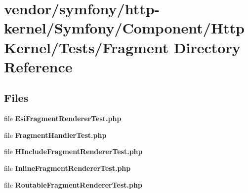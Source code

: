 \section{vendor/symfony/http-\/kernel/\+Symfony/\+Component/\+Http\+Kernel/\+Tests/\+Fragment Directory Reference}
\label{dir_25872647251e2ba33cad5cafd1098228}
\subsection*{Files}
\begin{DoxyCompactItemize}
\item 
file {\bf Esi\+Fragment\+Renderer\+Test.\+php}
\item 
file {\bf Fragment\+Handler\+Test.\+php}
\item 
file {\bf H\+Include\+Fragment\+Renderer\+Test.\+php}
\item 
file {\bf Inline\+Fragment\+Renderer\+Test.\+php}
\item 
file {\bf Routable\+Fragment\+Renderer\+Test.\+php}
\end{DoxyCompactItemize}
